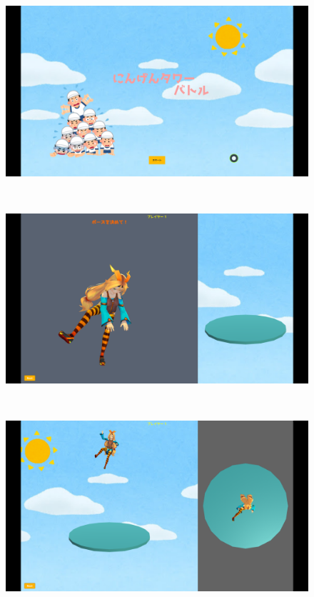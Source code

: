 \documentclass[uplatex,titlepage]{jsarticle}
\begin{document}
\begin{figure}[h]
 \begin{minipage}[b]{0.5\linewidth}
  \centering
  \includegraphics[keepaspectratio, scale=0.2]
  {images/startgame.png}
  \label{start}
 \end{minipage}
 \\
 \begin{minipage}[b]{0.5\linewidth}
  \centering
  \includegraphics[keepaspectratio, scale=0.2]
  {images/game4.png}
  \label{pose}
 \end{minipage}
\\
 \begin{minipage}[b]{0.5\linewidth}
  \centering
  \includegraphics[keepaspectratio, scale=0.2]
  {images/game2.png}
  \label{position1}
 \end{minipage}
 \end{figure}
\end{document}
